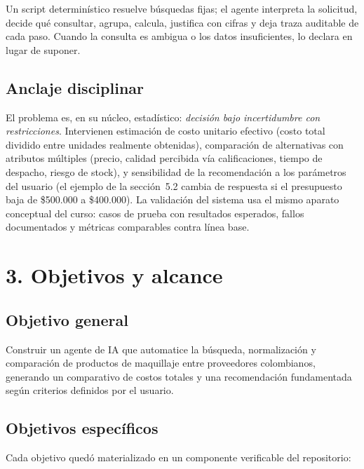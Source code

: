 \documentclass[11pt,letterpaper]{article}
\begin{document}
Un script determinístico resuelve búsquedas fijas; el agente interpreta la solicitud, decide qué
consultar, agrupa, calcula, justifica con cifras y deja traza auditable de cada paso. Cuando la
consulta es ambigua o los datos insuficientes, lo declara en lugar de suponer.

\subsection*{Anclaje disciplinar}

El problema es, en su núcleo, estadístico: \emph{decisión bajo incertidumbre con restricciones}.
Intervienen estimación de costo unitario efectivo (costo total dividido entre unidades realmente
obtenidas), comparación de alternativas con atributos múltiples (precio, calidad percibida vía
calificaciones, tiempo de despacho, riesgo de stock), y sensibilidad de la recomendación a los
parámetros del usuario (el ejemplo de la sección~5.2 cambia de respuesta si el presupuesto baja de
\$500.000 a \$400.000). La validación del sistema usa el mismo aparato conceptual del curso:
casos de prueba con resultados esperados, fallos documentados y métricas comparables contra línea base.

\section*{3. Objetivos y alcance}

\subsection*{Objetivo general}

Construir un agente de IA que automatice la búsqueda, normalización y comparación de productos de
maquillaje entre proveedores colombianos, generando un comparativo de costos totales y una
recomendación fundamentada según criterios definidos por el usuario.

\subsection*{Objetivos específicos}

Cada objetivo quedó materializado en un componente verificable del repositorio:
\end{document}
